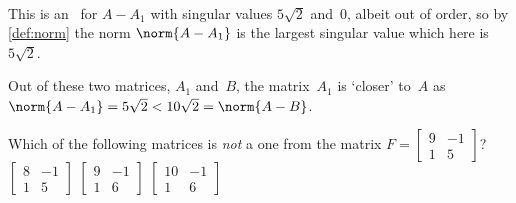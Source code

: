 \begin{example}
\begin{enumerate}
\begin{enumerate}
\begin{solution}
\begin{eqnarray*}
\end{eqnarray*}
This is an \svd\ for \(A-A_1\) with singular values \(5\sqrt2\) and~\(0\), albeit out of order, so by \autoref{def:norm} the norm \(\norm{A-A_1}\) is the largest singular value which here is~\(5\sqrt2\).
\end{solution}
\end{enumerate}
Out of these two matrices, \(A_1\) and~\(B\), the matrix~\(A_1\) is `closer' to~\(A\) as \(\norm{A-A_1}=5\sqrt2<10\sqrt2=\norm{A-B}\).
\end{enumerate}
\end{example}




\begin{activity}
Which of the following matrices is \emph{not} a  one from the matrix \(F=\begin{bmatrix} 9&-1\\1&5 \end{bmatrix}\)?
{\(\begin{bmatrix} 8&-1\\1&5 \end{bmatrix}\)}
{\(\begin{bmatrix} 9&-1\\1&6 \end{bmatrix}\)}
{\(\begin{bmatrix} 10&-1\\1&6 \end{bmatrix}\)}
\end{activity}




